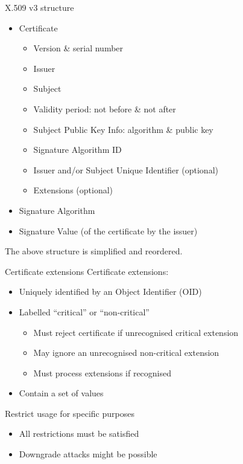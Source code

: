 \begin{frame}{X.509 v3 structure}
  \begin{itemize}[<+(1)->]
    \item Certificate
    \begin{itemize}
      \item Version \& serial number
      \item Issuer
      \item Subject
      \item Validity period: not before \& not after
      \item Subject Public Key Info: algorithm \& public key
      \item Signature Algorithm ID
      \item Issuer and/or Subject Unique Identifier (optional)
      \item Extensions (optional)
    \end{itemize}
    \item Signature Algorithm
    \item Signature Value (of the certificate by the issuer)
  \end{itemize}

  \pause
  The above structure is simplified and reordered.
\end{frame}

\begin{frame}{Certificate extensions}
  Certificate extensions:
  \begin{itemize}[<+(1)->]
    \item Uniquely identified by an Object Identifier (OID)
    \item Labelled \enquote{critical} or \enquote{non-critical}
    \par
    \begin{itemize}
      \item Must reject certificate if unrecognised critical extension
      \item May ignore an unrecognised non-critical extension
      \item Must process extensions if recognised
    \end{itemize}
    \item Contain a set of values
  \end{itemize}

  \pause
  Restrict usage for specific purposes
  \begin{itemize}[<+(1)->]
    \item All restrictions must be satisfied
    \item Downgrade attacks might be possible
  \end{itemize}
\end{frame}

